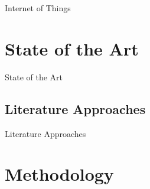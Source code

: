 \documentclass[xcolor={svgnames},compress,aspectratio=169]{beamer}
\begin{document}
\begin{frame}{Internet of Things}
\end{frame}

\section{State of the Art}

\begin{frame}{State of the Art}
\end{frame}

\subsection{Literature Approaches}

\begin{frame}{Literature Approaches}
\end{frame}

\section{Methodology}



\end{document}
